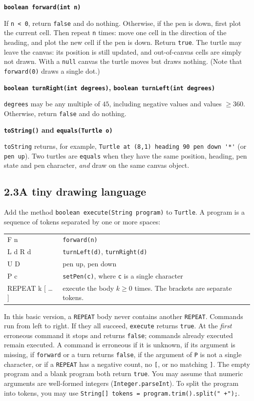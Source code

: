 \documentclass[11pt,a4paper]{article}
\newcommand{\code}[1]{\lstinline[basicstyle=\ttfamily\normalsize,basewidth=0.5em]{#1}}
\newcommand{\spec}[1]{\par\smallskip\textbf{#1}\par}
\begin{document}
\spec{\texttt{boolean forward(int n)}}
If \code{n < 0}, return \code{false} and do nothing. Otherwise, if the pen is
down, first plot the current cell. Then repeat \code{n} times: move one cell
in the direction of the heading, and plot the new cell if the pen is down.
Return \code{true}. The turtle may leave the canvas: its position is still
updated, and out-of-canvas cells are simply not drawn. With a \code{null}
canvas the turtle moves but draws nothing. (Note that \code{forward(0)} draws
a single dot.)

\spec{\texttt{boolean turnRight(int degrees)}, \texttt{boolean turnLeft(int degrees)}}
\code{degrees} may be any multiple of $45$, including negative values and values
$\geq 360$. Otherwise, return \code{false} and do nothing.

\spec{\texttt{toString()} and \texttt{equals(Turtle o)}}
\code{toString} returns, for example, \code{Turtle at (8,1) heading 90 pen down '*'}
(or \code{pen up}). Two turtles are \code{equals} when they have the same position,
heading, pen state and pen character, \emph{and} draw on the same canvas object.

\subsection*{2.3\quad A tiny drawing language}

Add the method \code{boolean execute(String program)} to \code{Turtle}.
A program is a sequence of tokens separated by one or more spaces:

\begin{tabular}{>{\ttfamily}l l}
F n & \code{forward(n)} \\
L d \quad R d & \code{turnLeft(d)}, \code{turnRight(d)} \\
U \quad D & pen up, pen down \\
P c & \code{setPen(c)}, where \code{c} is a single character \\
REPEAT k [ \dots{} ] & execute the body $k \geq 0$ times. The brackets are separate tokens. \\
\end{tabular}

In this basic version, a \code{REPEAT} body never contains another \code{REPEAT}.
Commands run from left to right. If they all succeed, \code{execute} returns
\code{true}. At the \emph{first} erroneous command it stops and returns
\code{false}; commands already executed remain executed. A command is erroneous
if it is unknown, if its argument is missing, if \code{forward} or a turn
returns \code{false}, if the argument of \code{P} is not a single character, or
if a \code{REPEAT} has a negative count, no \code{[}, or no matching \code{]}.
The empty program and a blank program both return \code{true}. You may assume
that numeric arguments are well-formed integers (\code{Integer.parseInt}).
To split the program into tokens, you may use
\code{String[] tokens = program.trim().split(" +");}.
\end{document}

